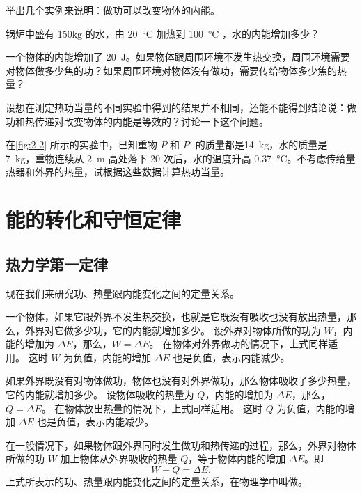 \begin{Practice}
\begin{question}
\item 举出几个实例来说明：做功可以改变物体的内能。
\item 锅炉中盛有 {150}{kg} 的水，由 \qty{20}{\celsius} 加热到 \qty{100}{\celsius} ，水的内能增加多少？
\item 一个物体的内能增加了 \qty{20}{J}。如果物体跟周围环境不发生热交换，周围环境需要对物体做多少焦的功？如果周围环境对物体没有做功，需要传给物体多少焦的热量？
\item 设想在测定热功当量的不同实验中得到的结果并不相同，还能不能得到结论说：做功和热传递对改变物体的内能是等效的？讨论一下这个问题。
\item 在\cref{fig:2-2} 所示的实验中，已知重物 $P$ 和 $P'$ 的质量都是\qty{14}{kg}，水的质量是 \qty{7}{kg}，重物连续从 \qty{2}{m} 高处落下 20 次后，水的温度升高 \qty{0. 37}{\celsius}。不考虑传给量热器和外界的热量，试根据这些数据计算热功当量。
\end{question}
\end{Practice}

\section{能的转化和守恒定律}
\subsection{热力学第一定律} 

现在我们来研究功、热量跟内能变化之间的定量关系。

一个物体，如果它跟外界不发生热交换，也就是它既没有吸收也没有放出热量，那么，外界对它做多少功，它的内能就增加多少。
设外界对物体所做的功为 $W$，内能的增加为 $\Delta E$，那么，$W=\Delta E$。
在物体对外界做功的情况下，上式同样适用。
这时 $W$ 为负值，内能的增加 $\Delta E$ 也是负值，表示内能减少。

如果外界既没有对物体做功，物体也没有对外界做功，那么物体吸收了多少热量，它的内能就增加多少。
设物体吸收的热量为 $Q$，内能的增加为 $\Delta E$，那么，$Q=\Delta E$。
在物体放出热量的情况下，上式同样适用。
这时 $Q$ 为负值，内能的增加 $\Delta E$ 也是负值，表示内能减少。

在一般情况下，如果物体跟外界同时发生做功和热传递的过程，那么，外界对物体所做的功 $W$ 加上物体从外界吸收的热量 $Q$，等于物体内能的增加 $\Delta E$。即
\[W+Q=\Delta E.\]
上式所表示的功、热量跟内能变化之间的定量关系，在物理学中叫做。

